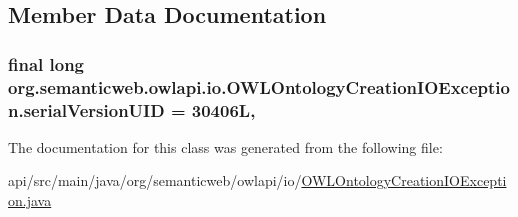 \subsection{Member Data Documentation}
\hypertarget{classorg_1_1semanticweb_1_1owlapi_1_1io_1_1_o_w_l_ontology_creation_i_o_exception_aad20bc608323bbb2b5220b50d9f4b8cc}{
\subsubsection[{serial\-Version\-U\-I\-D}]{\setlength{\rightskip}{0pt plus 5cm}final long org.\-semanticweb.\-owlapi.\-io.\-O\-W\-L\-Ontology\-Creation\-I\-O\-Exception.\-serial\-Version\-U\-I\-D = 30406\-L\hspace{0.3cm}{\ttfamily [static]}, {\ttfamily [private]}}}\label{classorg_1_1semanticweb_1_1owlapi_1_1io_1_1_o_w_l_ontology_creation_i_o_exception_aad20bc608323bbb2b5220b50d9f4b8cc}


The documentation for this class was generated from the following file\-:\begin{DoxyCompactItemize}
\item 
api/src/main/java/org/semanticweb/owlapi/io/\hyperlink{_o_w_l_ontology_creation_i_o_exception_8java}{O\-W\-L\-Ontology\-Creation\-I\-O\-Exception.\-java}\end{DoxyCompactItemize}
